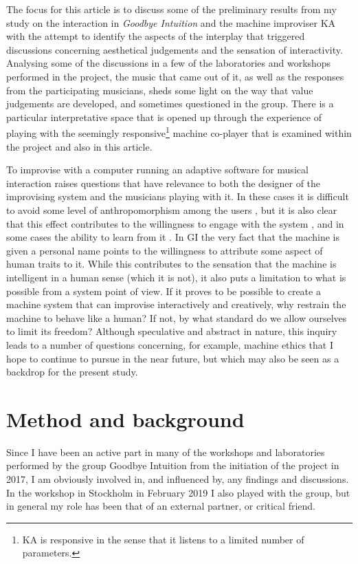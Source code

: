 \documentclass[11pt]{article}
\begin{document}
The focus for this article is to discuss some of the preliminary
results from my study on the interaction in \emph{Goodbye Intuition}
and the machine improviser KA with the attempt to identify the aspects
of the interplay that triggered discussions concerning aesthetical
judgements and the sensation of interactivity. Analysing some of the
discussions in a few of the laboratories and workshops performed in
the project, the music that came out of it, as well as the responses
from the participating musicians, sheds some light on the way that
value judgements are developed, and sometimes questioned in the
group. There is a particular interpretative space that is opened up
through the experience of playing with the seemingly
responsive\footnote{KA is responsive in the sense that it listens to a
    limited number of parameters.} machine co-player that is examined
within the project and also in this article.

To improvise with a computer running an adaptive software for musical
interaction raises questions that have relevance to both the designer
of the improvising system and the musicians playing with it. In these
cases it is difficult to avoid some level of anthropomorphism among
the users \citep{Blackwell2004,Young2009}, but it is also clear that
this effect contributes to the willingness to engage with the system
\citep{Nowak2003}, and in some cases the ability to learn from it
\citep{Schneider2018}. In GI the very fact that the machine is given a
personal name points to the willingness to attribute some aspect of
human traits to it. While this contributes to the sensation that the
machine is intelligent in a human sense (which it is not), it also
puts a limitation to what is possible from a system point of view. If
it proves to be possible to create a machine system that can improvise
interactively and creatively, why restrain the machine to behave like
a human? If not, by what standard do we allow ourselves to limit its
freedom? Although speculative and abstract in nature, this inquiry
leads to a number of questions concerning, for example, machine ethics
that I hope to continue to pursue in the near future, but which may
also be seen as a backdrop for the present study.

\section*{Method and background}
\label{sec:org820a2ae}
Since I have been an active part in many of the workshops and
laboratories performed by the group Goodbye Intuition from the
initiation of the project in 2017, I am obviously involved in, and
influenced by, any findings and discussions. In the workshop in
Stockholm in February 2019 I also played with the group, but in
general my role has been that of an external partner, or critical
friend.
\end{document}
